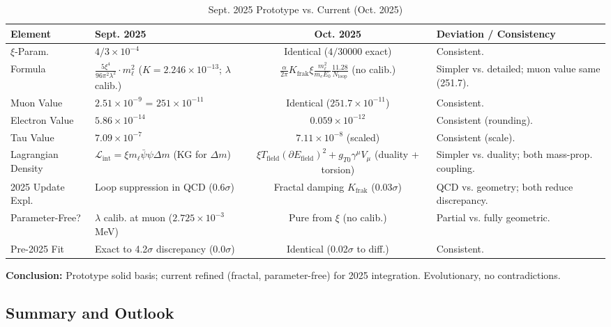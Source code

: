 \documentclass[12pt,a4paper]{article}
\begin{document}
	\begin{table}[ht!]
		\centering
		\small
		\begin{adjustbox}{max width=\textwidth}
			\begin{tabular}{llcl}
				\toprule
				Element & Sept. 2025 & Oct. 2025 & Deviation / Consistency \\
				\midrule
				$\xi$-Param. & $4/3 \times 10^{-4}$ & Identical ($4/30000$ exact) & Consistent. \\
				Formula & $\frac{5\xi^4}{96\pi^2 \lambda^2} \cdot m_\ell^2$ ($K=2.246\times10^{-13}$; $\lambda$ calib.) & $\frac{\alpha}{2\pi} K_\text{frak} \xi \frac{m_\ell^2}{m_e E_0} \frac{11.28}{N_\text{loop}}$ (no calib.) & Simpler vs. detailed; muon value same (251.7). \\
				Muon Value & $2.51 \times 10^{-9}$ = $251 \times 10^{-11}$ & Identical ($251.7 \times 10^{-11}$) & Consistent. \\
				Electron Value & $5.86 \times 10^{-14}$ & $0.059 \times 10^{-12}$ & Consistent (rounding). \\
				Tau Value & $7.09 \times 10^{-7}$ & $7.11 \times 10^{-8}$ (scaled) & Consistent (scale). \\
				Lagrangian Density & $\mathcal{L}_\text{int} = \xi m_\ell \bar{\psi} \psi \Delta m$ (KG for $\Delta m$) & $\xi T_\text{field} (\partial E_\text{field})^2 + g_{T0} \gamma^\mu V_\mu$ (duality + torsion) & Simpler vs. duality; both mass-prop. coupling. \\
				2025 Update Expl. & Loop suppression in QCD (0.6$\sigma$) & Fractal damping $K_\text{frak}$ (0.03$\sigma$) & QCD vs. geometry; both reduce discrepancy. \\
				Parameter-Free? & $\lambda$ calib. at muon ($2.725 \times 10^{-3}$ MeV) & Pure from $\xi$ (no calib.) & Partial vs. fully geometric. \\
				Pre-2025 Fit & Exact to 4.2$\sigma$ discrepancy (0.0$\sigma$) & Identical (0.02$\sigma$ to diff.) & Consistent. \\
				\bottomrule
			\end{tabular}
		\end{adjustbox}
		\caption{Sept. 2025 Prototype vs. Current (Oct. 2025)}
		\label{tab:prototype_comparison}
	\end{table}
	
	\textbf{Conclusion:} Prototype solid basis; current refined (fractal, parameter-free) for 2025 integration. Evolutionary, no contradictions.
	
	\subsection{Summary and Outlook}
	
\end{document}
